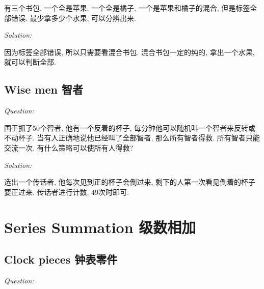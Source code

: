 \documentclass[12pt]{book}
\begin{document}
有三个书包, 一个全是苹果, 一个全是橘子, 一个是苹果和橘子的混合, 但是标签全部错误. 最少拿多少个水果, 可以分辨出来.

\noindent \textit{Solution:} 

因为标签全部错误, 所以只需要看混合书包. 混合书包一定的纯的, 拿出一个水果, 就可以判断全部.

\subsection{Wise men 智者}
\noindent \textit{Question:}

国王抓了50个智者, 他有一个反着的杯子, 每分钟他可以随机叫一个智者来反转或不动杯子. 当有人正确地说他已经叫了全部智者, 那么所有智者得救. 所有智者只能交流一次. 有什么策略可以使所有人得救?

\noindent \textit{Solution:} 

选出一个传话者, 他每次见到正的杯子会倒过来, 剩下的人第一次看见倒着的杯子要正过来. 传话者进行计数, 49次时即可.

\section{Series Summation 级数相加}
\subsection{Clock pieces 钟表零件}
\noindent \textit{Question:}
\end{document}

